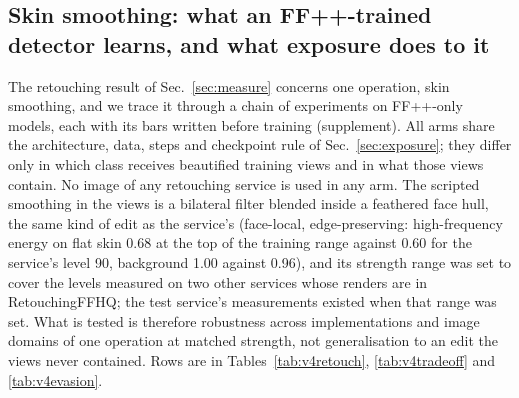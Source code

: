 
\subsection{Skin smoothing: what an FF++-trained detector learns, and what exposure does to it}
\label{sec:mechanism2}
The retouching result of Sec.~\ref{sec:measure} concerns one operation, skin smoothing, and we trace it through a chain
of experiments on FF++-only models, each with its bars written before training (supplement). All arms share the
architecture, data, steps and checkpoint rule of Sec.~\ref{sec:exposure}; they differ only in which class receives
beautified training views and in what those views contain. No image of any retouching service is used in any arm. The
scripted smoothing in the views is a bilateral filter blended inside a feathered face hull, the same kind of edit as the
service's (face-local, edge-preserving: high-frequency energy on flat skin 0.68 at the top of the training range
against 0.60 for the service's level 90, background 1.00 against 0.96), and its strength range was set to cover the
levels measured on two other services whose renders are in RetouchingFFHQ; the test service's measurements existed
when that range was set. What is tested is therefore robustness across implementations and image domains of one
operation at matched strength, not generalisation to an edit the views never contained. Rows are in
Tables~\ref{tab:v4retouch}, \ref{tab:v4tradeoff} and \ref{tab:v4evasion}.


